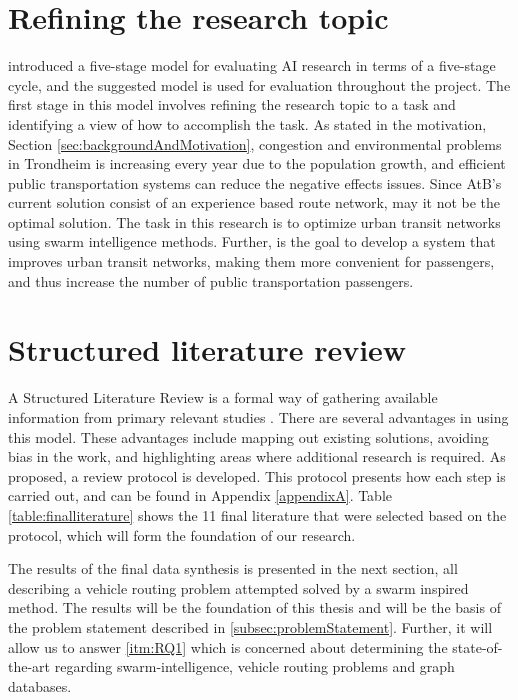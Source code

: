 \section{Refining the research topic}
\label{sec:definingResearchTopic}

\citet{cohen88} introduced a five-stage model for evaluating AI research in terms of a five-stage cycle, and the suggested model is used for evaluation throughout the project. The first stage in this model involves refining the research topic to a task and identifying a view of how to accomplish the task. As stated in the motivation, Section \vref{sec:backgroundAndMotivation}, congestion and environmental problems in Trondheim is increasing every year due to the population growth, and efficient public transportation systems can reduce the negative effects issues. Since AtB's current solution consist of an experience based route network, may it not be the optimal solution. The task in this research is to optimize urban transit networks using swarm intelligence methods. Further, is the goal to develop a system that improves urban transit networks, making them more convenient for passengers, and thus increase the number of public transportation passengers.

\section{Structured literature review}
\label{sec:structuredLiteratureReview}

A Structured Literature Review is a formal way of gathering available information from primary relevant studies \citep{kofod2014}. There are several advantages in using this model. These advantages include mapping out existing solutions, avoiding bias in the work, and highlighting areas where additional research is required. As proposed, a review protocol is developed. This protocol presents how each step is carried out, and can be found in Appendix \vref{appendixA}. Table \vref{table:finalliterature} shows the 11 final literature that were selected based on the protocol, which will form the foundation of our research. 

The results of the final data synthesis is presented in the next section, all describing a vehicle routing problem attempted solved by a swarm inspired method. The results will be the foundation of this thesis and will be the basis of the problem statement described in \vref{subsec:problemStatement}. Further, it will allow us to answer \ref{itm:RQ1} which is concerned about determining the state-of-the-art regarding swarm-intelligence, vehicle routing problems and graph databases. 

